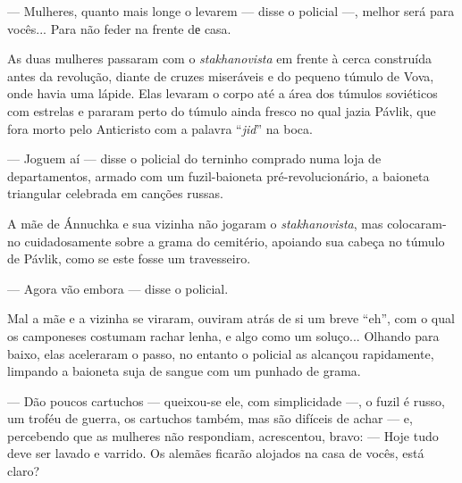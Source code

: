 --- Mulheres, quanto mais longe o levarem --- disse o policial ---,
melhor será para vocês... Para não feder na frente dе casa.

As duas mulheres passaram com o \emph{stakhanovista} em frente à cerca
construída antes da revolução, diante de cruzes miseráveis e do pequeno
túmulo de Vova, onde havia uma lápide. Elas levaram o corpo até a área
dos túmulos soviéticos com estrelas e pararam perto do túmulo ainda
fresco no qual jazia Pávlik, que fora morto pelo Anticristo com a
palavra ``\emph{jid}'' na boca.

--- Joguem aí --- disse o policial do terninho comprado numa loja de
departamentos, armado com um fuzil-baioneta pré-revolucionário, a
baioneta triangular celebrada em canções russas.

A mãe de Ánnuchka e sua vizinha não jogaram o \emph{stakhanovista}, mas
colocaram-no cuidadosamente sobre a grama do cemitério, apoiando sua
cabeça no túmulo de Pávlik, como se este fosse um travesseiro.

--- Agora vão embora --- disse o policial.

Mal a mãe e a vizinha se viraram, ouviram atrás de si um breve ``eh'',
com o qual os camponeses costumam rachar lenha, e algo como um soluço...
Olhando para baixo, elas aceleraram o passo, no entanto o policial as
alcançou rapidamente, limpando a baioneta suja de sangue com um punhado
de grama.

--- Dão poucos cartuchos --- queixou-se ele, com simplicidade ---, o
fuzil é russo, um troféu de guerra, os cartuchos também, mas são
difíceis de achar --- e, percebendo que as mulheres não respondiam,
acrescentou, bravo: --- Hoje tudo deve ser lavado e varrido. Os alemães
ficarão alojados na casa de vocês, está claro?

